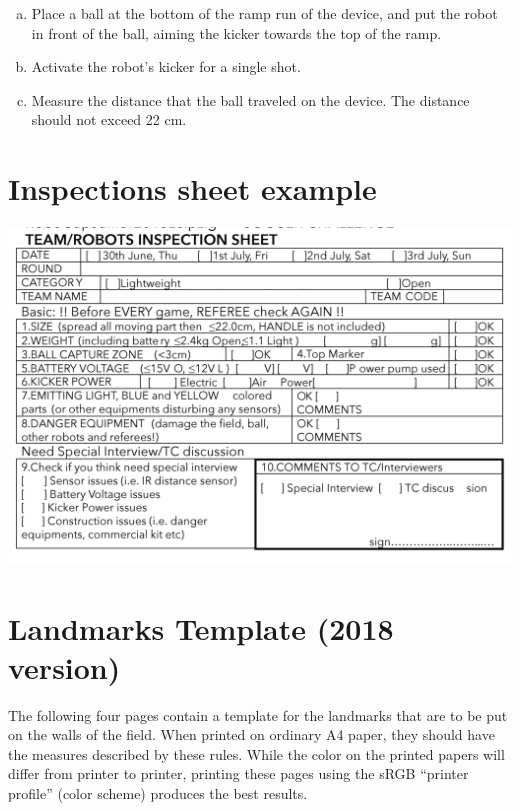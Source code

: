 \documentclass{article}
\begin{document}
\begin{enumerate}[a.]
    \item Place a ball at the bottom of the ramp run of the
        device, and put the robot in front of the ball, aiming the kicker
        towards the top of the ramp.

    \item Activate the robot's kicker for a single shot.

    \item Measure the distance that the ball traveled on the device. The
        distance should not exceed 22 cm.

\end{enumerate}


\section{Inspections sheet example\label{ref-065}}

\includegraphics[width=1\textwidth]{media/image10.png}

\section{Landmarks Template (2018 version)\label{landmarks}}

The following four pages contain a template for the landmarks that are to be
put on the walls of the field. When printed on ordinary A4 paper, they should
have the measures described by these rules. While the color on the printed
papers will differ from printer to printer, printing these pages using the sRGB
``printer profile'' (color scheme) produces the best results.
\end{document}
